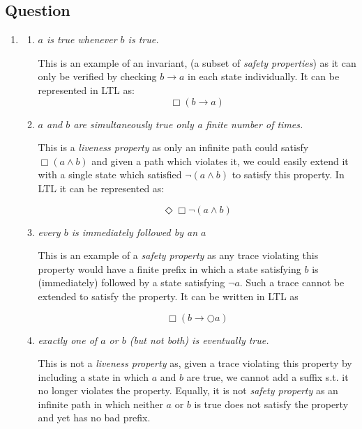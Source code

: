 \documentclass[12pt,a4paper]{article}
\newcounter{question}\setcounter{question}{1}
\newenvironment{question}{%
\subsection*{Question \arabic{question}}}%
{\stepcounter{question}}
\begin{document}
\begin{question}
  \begin{enumerate}[label= (\alph*)]
    \item
          \begin{enumerate}[label= (\roman*)]
            \item
                  \textit{$a$ is true whenever $b$ is true.}

                  This is an example of an invariant, (a subset of \textit{safety properties}) as it can only be verified by checking $b \rightarrow a$ in each state individually. It can be represented in LTL as:
                  \[
                  \Box (b \rightarrow a)
                  \]

            \item
                  \textit{$a$ and $b$ are simultaneously true only a finite number of times.}

                  This is a \textit{liveness property} as only an infinite path could satisfy $\Box(a \wedge b)$ and given a path which violates it, we could easily extend it with a single state which satisfied $\neg (a \wedge b)$ to satisfy this property. In LTL it can be represented as:


                  \[
                  \Diamond \Box \neg (a \wedge b)
                  \]

            \item
                  \textit{every $b$ is immediately followed by an $a$}

                  This is an example of a \textit{safety property} as any trace violating this property would have a finite prefix in which a state satisfying $b$ is (immediately) followed by a state satisfying $\neg a$. Such a trace cannot be extended to satisfy the property. It can be written in LTL as


                  \[
                  \Box ( b \rightarrow \bigcirc a )
                  \]

            \item
                  \textit{exactly one of $a$ or $b$ (but not both) is eventually true.}

                  This is not a \textit{liveness property} as, given a trace violating this property by including a state in which $a$ and $b$ are true, we cannot add a suffix s.t. it no longer violates the property. Equally, it is not \textit{safety property} as an infinite path in which neither $a$ or $b$ is true does not satisfy the property and yet has no bad prefix.


\end{enumerate}
\end{enumerate}
\end{question}
\end{document}
